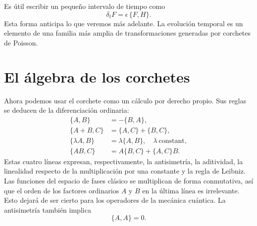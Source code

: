 \begin{classroomqa}
\end{classroomqa}

Es útil escribir un pequeño intervalo de tiempo como
\begin{equation}
  \delta_t F=\epsilon\,\{F,H\}.
  \label{eq:l8-small-time-step}
\end{equation}
Esta forma anticipa lo que veremos más adelante. La evolución temporal es un elemento de una familia más amplia de transformaciones generadas por corchetes de Poisson.

\section{El álgebra de los corchetes}

Ahora podemos usar el corchete como un cálculo por derecho propio. Sus reglas se deducen de la diferenciación ordinaria:
\begin{align}
  \{A,B\}&=-\{B,A\}, \label{eq:l8-antisymmetry}\\
  \{A+B,C\}&=\{A,C\}+\{B,C\}, \label{eq:l8-additivity}\\
  \{\lambda A,B\}&=\lambda\{A,B\},
    \quad \lambda\ \text{constant}, \label{eq:l8-scalar-rule}\\
  \{AB,C\}&=A\{B,C\}+\{A,C\}B. \label{eq:l8-leibniz}
\end{align}
Estas cuatro líneas expresan, respectivamente, la antisimetría, la aditividad, la linealidad respecto de la multiplicación por una constante y la regla de Leibniz.
Las funciones del espacio de fases clásico se multiplican de forma conmutativa, así que el orden de los factores ordinarios \(A\) y \(B\) en la última línea es irrelevante. Esto dejará de ser cierto para los operadores de la mecánica cuántica. La antisimetría también implica
\begin{equation}
  \{A,A\}=0.
  \label{eq:l8-self-bracket}
\end{equation}

